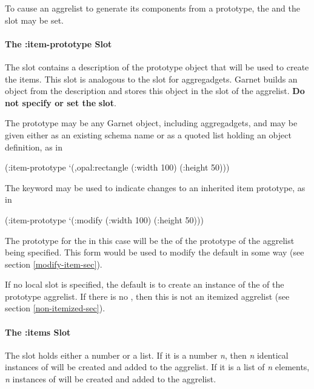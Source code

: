To cause an aggrelist to generate its components from a prototype, the
 and the  slot may be set.

\paragraph{The :item-prototype Slot}
\label{the-i-p-slot}
The  slot contains a description of the
prototype object that will be used to create the items.  This slot is
analogous to the  slot for aggregadgets.
Garnet builds an object from the  description and stores
this object in the  slot of the aggrelist.
{\bf Do not specify or set the}  {\bf slot}.

The prototype may be any Garnet object, including
aggregadgets, and may be given either as an existing schema name
or as a quoted list holding an object definition, as in
\begin{programexample}
(:item-prototype `(,opal:rectangle (:width 100)
                                   (:height 50)))
\end{programexample}
The keyword  
may be used to indicate changes to an inherited item prototype, as in
\begin{programexample}
(:item-prototype `(:modify (:width 100)
                           (:height 50)))
\end{programexample}
The prototype for the  in this case will be
the 
of the prototype of the aggrelist being specified.
This form would be used to modify the default in some way (see section
\ref{modify-item-sec}).

If no local  slot is specified, the default is
to create an instance of the  of the
prototype aggrelist.  If there is no ,
then this is not an itemized aggrelist (see section \ref{non-itemized-sec}).

\paragraph{The :items Slot}
The  slot holds either a number or a list.  If it is a
number {\it n}, then {\it n} identical instances of 
will be created and added to the aggrelist.  If it is a list of {\it n}
elements, {\it n} instances of  will be
created and added to the aggrelist.

